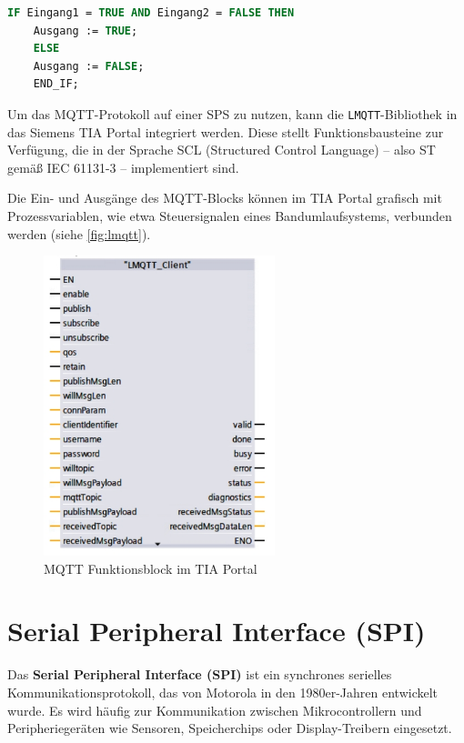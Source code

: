 \begin{lstlisting}[language=Pascal, caption={Beispielprogramm in Structured Text}, label={lst:st_example}]
	IF Eingang1 = TRUE AND Eingang2 = FALSE THEN
	Ausgang := TRUE;
	ELSE
	Ausgang := FALSE;
	END_IF;
\end{lstlisting}

Um das MQTT-Protokoll auf einer SPS zu nutzen, kann die \texttt{LMQTT}-Bibliothek in das Siemens TIA Portal integriert werden. Diese stellt Funktionsbausteine zur Verfügung, die in der Sprache SCL (Structured Control Language) – also ST gemäß IEC 61131-3 – implementiert sind.

Die Ein- und Ausgänge des MQTT-Blocks können im TIA Portal grafisch mit Prozessvariablen, wie etwa Steuersignalen eines Bandumlaufsystems, verbunden werden (siehe \autoref{fig:lmqtt}).


\begin{figure}[H] %
	\centering
	\includegraphics[width=0.6\textwidth]{images/LMQTT.jpeg}
	\caption{MQTT Funktionsblock im TIA Portal \autocite{siemensMQTT}}
	\label{fig:lmqtt}
\end{figure}

\section{Serial Peripheral Interface (SPI)}
\label{sec:spi}

Das \textbf{Serial Peripheral Interface (SPI)} ist ein synchrones serielles Kommunikationsprotokoll, das von Motorola in den 1980er-Jahren entwickelt wurde. Es wird häufig zur Kommunikation zwischen Mikrocontrollern und Peripheriegeräten wie Sensoren, Speicherchips oder Display-Treibern eingesetzt.

